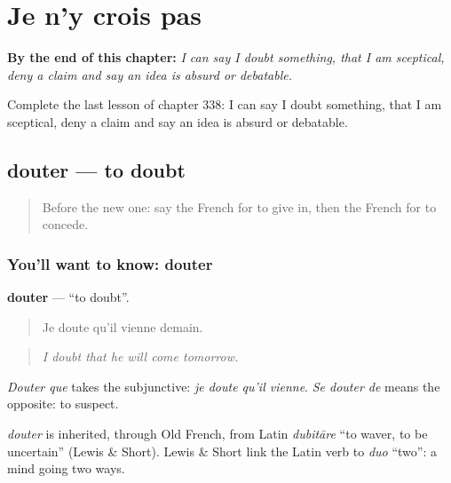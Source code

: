 
\chapter{Je n'y crois pas}
\label{ch:fr-je-n-y-crois-pas}

\begin{chapteropening}
\textbf{By the end of this chapter:} \emph{I can say I doubt something, that I am sceptical, deny a claim and say an idea is absurd or debatable.}

Complete the last lesson of chapter 338: I can say I doubt something, that I am sceptical, deny a claim and say an idea is absurd or debatable.
\end{chapteropening}

\section[douter]{douter — to doubt}

\label{lesson:FR-C338-douter}



\begin{quote}
Before the new one: say the French for to give in, then the French for to concede.
\end{quote}

\subsection*{You'll want to know: douter}
\textbf{douter} — \textquotedblleft{}to doubt\textquotedblright{}.

\begin{quote}
Je doute qu'il vienne demain.
\end{quote}

\begin{quote}
\emph{I doubt that he will come tomorrow.}
\end{quote}

\emph{Douter que} takes the subjunctive: \emph{je doute qu'il vienne}. \emph{Se douter de} means the opposite: to suspect.

\begin{cousinweb}
\emph{douter} is inherited, through Old French, from Latin \emph{dubitāre} \textquotedblleft{}to waver, to be uncertain\textquotedblright{} (Lewis \& Short). Lewis \& Short link the Latin verb to \emph{duo} \textquotedblleft{}two\textquotedblright{}: a mind going two ways.
\end{cousinweb}


